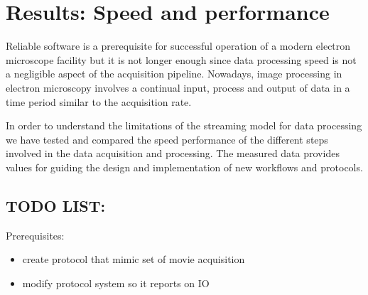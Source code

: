 \section{Results: Speed and performance}

Reliable software is a prerequisite for successful operation of a modern electron microscope facility but it is not longer enough since data processing speed is not a negligible aspect of the acquisition pipeline. Nowadays, image processing  in electron microscopy involves a continual input, process and output of data in a time period similar to the acquisition rate.

In order to understand the limitations of the streaming model for data processing we have tested and compared the speed performance of the different steps involved in the data acquisition and processing. The measured data provides values for guiding the design and implementation of new workflows and protocols.
 
\subsection{ TODO LIST:}

Prerequisites:
\begin{itemize}
   \item create protocol that mimic set of movie acquisition
   \item modify protocol system so it reports on IO
\end{itemize}
 
